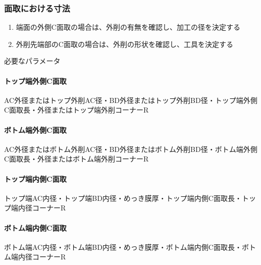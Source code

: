 \subsubsection{面取における寸法}
\begin{enumerate}
\item {}端面の外側C面取の場合は、外削の有無を確認し、加工の径を決定する
\item {}外削先端部のC面取の場合は、外削の形状を確認し、工具を決定する
\end{enumerate}
\begin{Parameter}{必要なパラメータ}
\paragraph*{トップ端外側C面取}
AC外径またはトップ外削AC径・BD外径またはトップ外削BD径・トップ端外側C面取長・外径またはトップ端外削コーナーR
\tcbline*
\paragraph*{ボトム端外側C面取}
AC外径またはボトム外削AC径・BD外径またはボトム外削BD径・ボトム端外側C面取長・外径またはボトム端外削コーナーR
\tcbline*
\paragraph*{トップ端内側C面取}
トップ端AC内径・トップ端BD内径・めっき膜厚・トップ端内側C面取長・トップ端内径コーナーR
\tcbline*
\paragraph*{ボトム端内側C面取}
ボトム端AC内径・ボトム端BD内径・めっき膜厚・ボトム端内側C面取長・ボトム端内径コーナーR
\end{Parameter}

\clearpage
